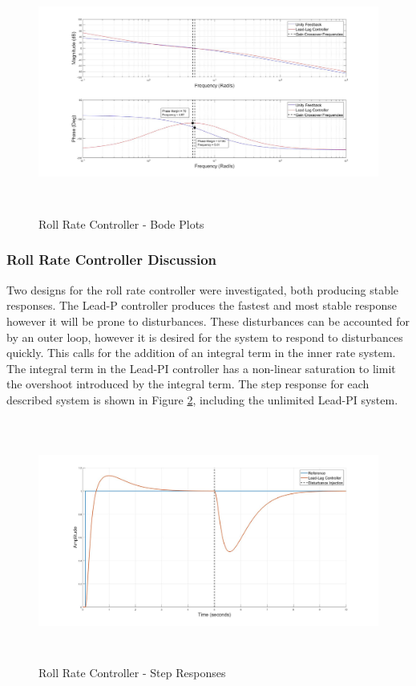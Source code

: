 \documentclass[12pt]{report}
\begin{document}
\begin{figure}[H]
	\centering
	\includegraphics[height = 8cm]{../Design/Matlab/Controllers/roll_rate_bode.jpg}
	\caption{Roll Rate Controller -  Bode Plots}
	\label{IM_RollRateControlBode}
\end{figure}

\subsubsection{Roll Rate Controller Discussion}
Two designs for the roll rate controller were investigated, both producing stable responses. The Lead-P controller produces the fastest and most stable response however it will be prone to disturbances. These disturbances can be accounted for by an outer loop, however it is desired for the system to respond to disturbances quickly. This calls for the addition of an integral term in the inner rate system. 
The integral term in the Lead-PI controller has a non-linear saturation to limit the overshoot introduced by the integral term. The step response for each described system is shown in Figure \ref{IM_RollRateStep}, including the unlimited Lead-PI system.

\begin{figure}[H]
	\centering
	\includegraphics[height = 8cm]{../Design/Matlab/Controllers/roll_rate_step.jpg}
	\caption{Roll Rate Controller -  Step Responses}
	\label{IM_RollRateStep}
\end{figure}
\end{document}

